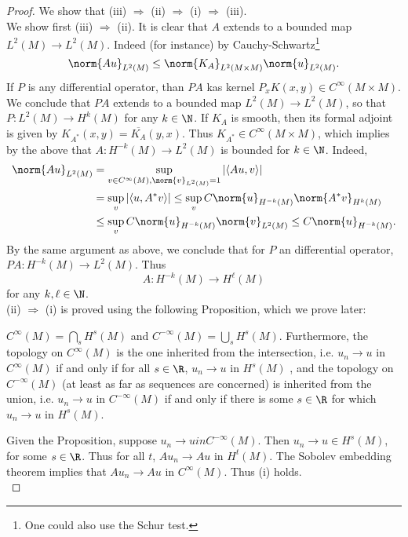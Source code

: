 \documentclass[12pt]{article}
\begin{document}
\begin{proof}

We show that (iii) $\Rightarrow$ (ii) $\Rightarrow$ (i) $\Rightarrow$ (iii).\\[1.5ex]

We show first (iii) $\Rightarrow$ (ii). It is clear that $A$ extends to a bounded map $L^2(M) \to L^2(M)$. Indeed (for instance) by Cauchy-Schwartz\footnote{One could also use the Schur test.}
\[\norm{Au}_{L^2(M)} \leq \norm{K_A}_{L^2(M\times M)}\norm{u}_{L^2(M)}.\]
If $P$ is any differential operator, than $PA$ kas kernel $P_xK(x,y) \in C^\infty(M \times M)$. We conclude that $PA$ extends to a bounded map $L^2(M) \to L^2(M)$, so that $P:L^2(M) \to H^k(M)$ for any $k \in \N$. If $K_A$ is smooth, then its formal adjoint is given by $K_{A^\ast}(x,y) = \overline {K_A}(y,x)$. Thus $K_{A^\ast} \in C^\infty(M\times M)$, which implies by the above that $A:H^{-k}(M) \to L^2(M)$ is bounded for $k \in \N$. Indeed,
\begin{align*}
\norm{Au}_{L^2(M)} &= \sup_{v \in C^\infty(M), \norm{v}_{L^2(M)} = 1} |\langle Au,v\rangle|\\
&= \sup_v |\langle u,A^{\ast}v\rangle| \leq \sup_{v} C\norm{u}_{H^{-k}(M)}\norm{A^{\ast}v}_{H^k(M)}\\
&\leq \sup_v C\norm{u}_{H^{-k}(M)}\norm{v}_{L^2(M)} \leq C\norm{u}_{H^{-k}(M)}.\end{align*}
By the same argument as above, we conclude that for $P$ an differential operator, $PA:H^{-k}(M) \to L^2(M)$. Thus
\[A:H^{-k}(M) \to H^{\ell}(M)\] for any $k,\ell \in \N$.\\[1.5ex]

(ii) $\Rightarrow$ (i) is proved using the following Proposition, which we prove later:
\begin{prop}$C^\infty(M) = \bigcap_{s} H^s(M)$ and $C^{-\infty}(M) = \bigcup_{s} H^s(M)$. Furthermore, the topology on $C^\infty(M)$ is the one inherited from the intersection, i.e. $u_n \to u$ in $C^\infty(M)$ if and only if for all $s \in \R$, $u_n \to u$ in $H^s(M)$ , and the topology on $C^{-\infty}(M)$ (at least as far as sequences are concerned) is inherited from the union, i.e. $u_n \to u$ in $C^{-\infty}(M)$ if and only if there is some $s \in \R$ for which $u_n \to u$ in $H^s(M)$.\end{prop}
Given the Proposition, suppose $u_n \to u in C^{-\infty}(M)$. Then $u_n \to u \in H^s(M)$, for some $s \in \R$. Thus for all $t$, $Au_n \to Au$ in $H^t(M)$. The Sobolev embedding theorem implies that $Au_n \to Au$ in $C^\infty(M)$. Thus (i) holds.\\[1.5ex]



\end{proof}
\end{document}
